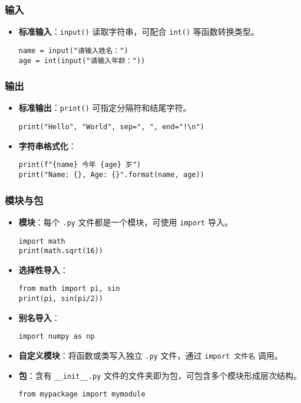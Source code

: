 \documentclass[a4paper,12pt]{ctexart}
\begin{document}
\subsubsection{输入}
\begin{itemize}
  \item \textbf{标准输入}：\texttt{input()} 读取字符串，可配合 \texttt{int()} 等函数转换类型。
\begin{lstlisting}
name = input("请输入姓名：")
age = int(input("请输入年龄："))
\end{lstlisting}
\end{itemize}

\subsubsection{输出}
\begin{itemize}
  \item \textbf{标准输出}：\texttt{print()} 可指定分隔符和结尾字符。
\begin{lstlisting}
print("Hello", "World", sep=", ", end="!\n")
\end{lstlisting}
  \item \textbf{字符串格式化}：
\begin{lstlisting}
print(f"{name} 今年 {age} 岁")
print("Name: {}, Age: {}".format(name, age))
\end{lstlisting}
\end{itemize}


\subsubsection{模块与包}
\begin{itemize}
  \item \textbf{模块}：每个 \texttt{.py} 文件都是一个模块，可使用 \texttt{import} 导入。
\begin{lstlisting}
import math
print(math.sqrt(16))
\end{lstlisting}
  \item \textbf{选择性导入}：
\begin{lstlisting}
from math import pi, sin
print(pi, sin(pi/2))
\end{lstlisting}
  \item \textbf{别名导入}：
\begin{lstlisting}
import numpy as np
\end{lstlisting}
  \item \textbf{自定义模块}：将函数或类写入独立 \texttt{.py} 文件，通过 \texttt{import 文件名} 调用。
  \item \textbf{包}：含有 \texttt{\_\_init\_\_.py} 文件的文件夹即为包，可包含多个模块形成层次结构。
\begin{lstlisting}
from mypackage import mymodule
\end{lstlisting}
\end{itemize}
\end{document}
